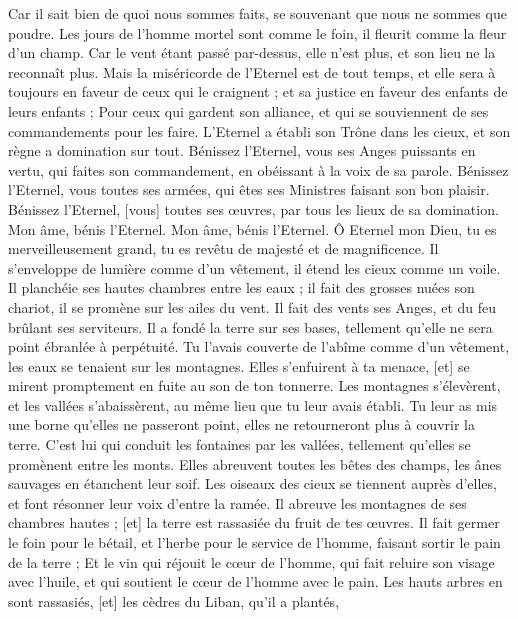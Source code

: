 \begin{multicols}{2}
Car il sait bien de quoi nous sommes faits, se souvenant que nous ne sommes que poudre.
Les jours de l'homme mortel sont comme le foin, il fleurit comme la fleur d'un champ.
Car le vent étant passé par-dessus, elle n'est plus, et son lieu ne la reconnaît plus.
Mais la miséricorde de l'Eternel est de tout temps, et elle sera à toujours en faveur de ceux qui le craignent ; et sa justice en faveur des enfants de leurs enfants ;
Pour ceux qui gardent son alliance, et qui se souviennent de ses commandements pour les faire.
L'Eternel a établi son Trône dans les cieux, et son règne a domination sur tout.
Bénissez l'Eternel, vous ses Anges puissants en vertu, qui faites son commandement, en obéissant à la voix de sa parole.
Bénissez l'Eternel, vous toutes ses armées, qui êtes ses Ministres faisant son bon plaisir.
Bénissez l'Eternel, [vous] toutes ses œuvres, par tous les lieux de sa domination. Mon âme, bénis l'Eternel.
\VerseOne{}Mon âme, bénis l'Eternel. Ô Eternel mon Dieu, tu es merveilleusement grand, tu es revêtu de majesté et de magnificence.
Il s'enveloppe de lumière comme d'un vêtement, il étend les cieux comme un voile.
Il planchéie ses hautes chambres entre les eaux ; il fait des grosses nuées son chariot, il se promène sur les ailes du vent.
Il fait des vents ses Anges, et du feu brûlant ses serviteurs.
Il a fondé la terre sur ses bases, tellement qu'elle ne sera point ébranlée à perpétuité.
Tu l'avais couverte de l'abîme comme d'un vêtement, les eaux se tenaient sur les montagnes.
Elles s'enfuirent à ta menace, [et] se mirent promptement en fuite au son de ton tonnerre.
Les montagnes s'élevèrent, et les vallées s'abaissèrent, au même lieu que tu leur avais établi.
Tu leur as mis une borne qu'elles ne passeront point, elles ne retourneront plus à couvrir la terre.
C'est lui qui conduit les fontaines par les vallées, tellement qu'elles se promènent entre les monts.
Elles abreuvent toutes les bêtes des champs, les ânes sauvages en étanchent leur soif.
Les oiseaux des cieux se tiennent auprès d'elles, et font résonner leur voix d'entre la ramée.
Il abreuve les montagnes de ses chambres hautes ; [et] la terre est rassasiée du fruit de tes œuvres.
Il fait germer le foin pour le bétail, et l'herbe pour le service de l'homme, faisant sortir le pain de la terre ;
Et le vin qui réjouit le cœur de l'homme, qui fait reluire son visage avec l'huile, et qui soutient le cœur de l'homme avec le pain.
Les hauts arbres en sont rassasiés, [et] les cèdres du Liban, qu'il a plantés,

\end{multicols}

